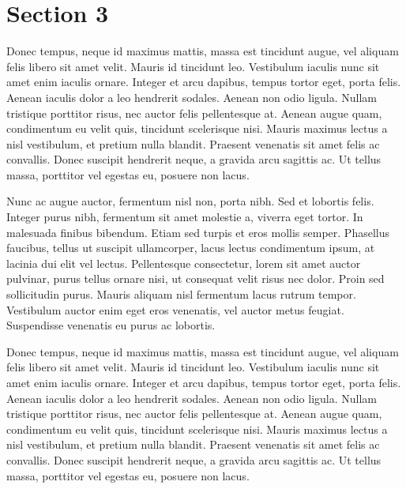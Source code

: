 \documentclass[twocolumn,superscriptaddress,aps]{revtex4-1}
\begin{document}
\section{Section 3}

Donec tempus, neque id maximus mattis, massa est tincidunt augue, vel aliquam felis libero sit amet velit. Mauris id tincidunt leo. Vestibulum iaculis nunc sit amet enim iaculis ornare. Integer et arcu dapibus, tempus tortor eget, porta felis. Aenean iaculis dolor a leo hendrerit sodales. Aenean non odio ligula. Nullam tristique porttitor risus, nec auctor felis pellentesque at. Aenean augue quam, condimentum eu velit quis, tincidunt scelerisque nisi. Mauris maximus lectus a nisl vestibulum, et pretium nulla blandit. Praesent venenatis sit amet felis ac convallis. Donec suscipit hendrerit neque, a gravida arcu sagittis ac. Ut tellus massa, porttitor vel egestas eu, posuere non lacus.

Nunc ac augue auctor, fermentum nisl non, porta nibh. Sed et lobortis felis. Integer purus nibh, fermentum sit amet molestie a, viverra eget tortor. In malesuada finibus bibendum. Etiam sed turpis et eros mollis semper. Phasellus faucibus, tellus ut suscipit ullamcorper, lacus lectus condimentum ipsum, at lacinia dui elit vel lectus. Pellentesque consectetur, lorem sit amet auctor pulvinar, purus tellus ornare nisi, ut consequat velit risus nec dolor. Proin sed sollicitudin purus. Mauris aliquam nisl fermentum lacus rutrum tempor. Vestibulum auctor enim eget eros venenatis, vel auctor metus feugiat. Suspendisse venenatis eu purus ac lobortis.

Donec tempus, neque id maximus mattis, massa est tincidunt augue, vel aliquam felis libero sit amet velit. Mauris id tincidunt leo. Vestibulum iaculis nunc sit amet enim iaculis ornare. Integer et arcu dapibus, tempus tortor eget, porta felis. Aenean iaculis dolor a leo hendrerit sodales. Aenean non odio ligula. Nullam tristique porttitor risus, nec auctor felis pellentesque at. Aenean augue quam, condimentum eu velit quis, tincidunt scelerisque nisi. Mauris maximus lectus a nisl vestibulum, et pretium nulla blandit. Praesent venenatis sit amet felis ac convallis. Donec suscipit hendrerit neque, a gravida arcu sagittis ac. Ut tellus massa, porttitor vel egestas eu, posuere non lacus.





\end{document}
